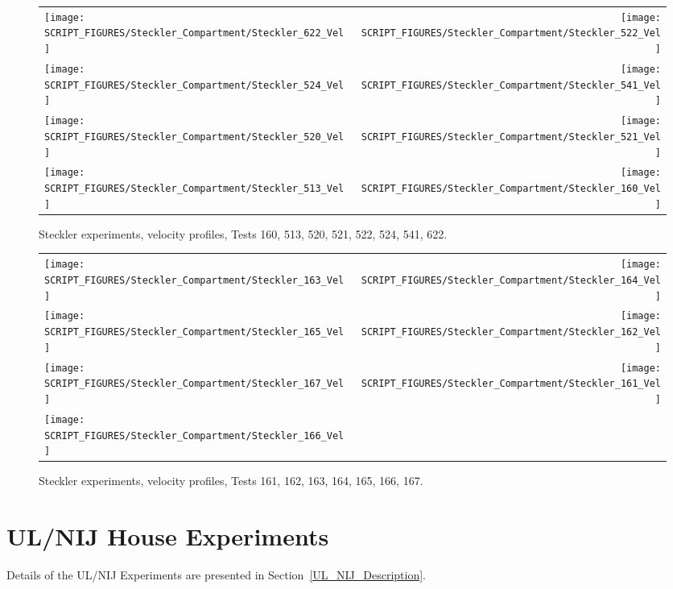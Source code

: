\begin{figure}[p]
\begin{tabular*}{\textwidth}{l@{\extracolsep{\fill}}r}
\texttt{[image: SCRIPT\_FIGURES/Steckler\_Compartment/Steckler\_622\_Vel]} &
\texttt{[image: SCRIPT\_FIGURES/Steckler\_Compartment/Steckler\_522\_Vel]} \\
\texttt{[image: SCRIPT\_FIGURES/Steckler\_Compartment/Steckler\_524\_Vel]} &
\texttt{[image: SCRIPT\_FIGURES/Steckler\_Compartment/Steckler\_541\_Vel]} \\
\texttt{[image: SCRIPT\_FIGURES/Steckler\_Compartment/Steckler\_520\_Vel]} &
\texttt{[image: SCRIPT\_FIGURES/Steckler\_Compartment/Steckler\_521\_Vel]} \\
\texttt{[image: SCRIPT\_FIGURES/Steckler\_Compartment/Steckler\_513\_Vel]} &
\texttt{[image: SCRIPT\_FIGURES/Steckler\_Compartment/Steckler\_160\_Vel]}
\end{tabular*}
\caption{Steckler experiments, velocity profiles, Tests 160, 513, 520, 521, 522, 524, 541, 622.}
\label{Steckler_Vel_6}
\end{figure}

\begin{figure}[p]
\begin{tabular*}{\textwidth}{l@{\extracolsep{\fill}}r}
\texttt{[image: SCRIPT\_FIGURES/Steckler\_Compartment/Steckler\_163\_Vel]} &
\texttt{[image: SCRIPT\_FIGURES/Steckler\_Compartment/Steckler\_164\_Vel]} \\
\texttt{[image: SCRIPT\_FIGURES/Steckler\_Compartment/Steckler\_165\_Vel]} &
\texttt{[image: SCRIPT\_FIGURES/Steckler\_Compartment/Steckler\_162\_Vel]} \\
\texttt{[image: SCRIPT\_FIGURES/Steckler\_Compartment/Steckler\_167\_Vel]} &
\texttt{[image: SCRIPT\_FIGURES/Steckler\_Compartment/Steckler\_161\_Vel]} \\
\texttt{[image: SCRIPT\_FIGURES/Steckler\_Compartment/Steckler\_166\_Vel]} &
\end{tabular*}
\caption{Steckler experiments, velocity profiles, Tests 161, 162, 163, 164, 165, 166, 167.}
\label{Steckler_Vel_7}
\end{figure}


\clearpage

\section{UL/NIJ House Experiments}

Details of the UL/NIJ Experiments are presented in Section~\ref{UL_NIJ_Description}.

